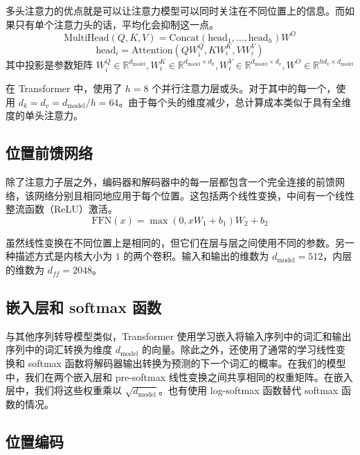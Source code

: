 多头注意力的优点就是可以让注意力模型可以同时关注在不同位置上的信息。而如果只有单个注意力头的话，平均化会抑制这一点。
\begin{equation}
\text{MultiHead}(Q, K, V) = \text{Concat}(\text{head}_1, ..., \text{head}_h)W^O
\label{eq3.2}
\end{equation}
\begin{equation}
\text{head}_i = \text{Attention}(QW_i^Q, KW_i^K, VW_i^V)
\label{eq3.3}
\end{equation}
其中投影是参数矩阵 $W_i^Q \in \mathbb{R}^{d_{\text{model}}}, W_i^K \in \mathbb{R}^{d_{\text{model}} \times d_k}, W_i^V \in \mathbb{R}^{d_{\text{model}} \times d_v}, W^O \in \mathbb{R}^{hd_v \times d_{\text{model}}}$

在 Transformer 中，使用了 $h = 8$ 个并行注意力层或头。对于其中的每一个，使用 $d_k = d_v = d_{\text{model}} / h = 64$。由于每个头的维度减少，总计算成本类似于具有全维度的单头注意力。

\subsection{位置前馈网络}
除了注意力子层之外，编码器和解码器中的每一层都包含一个完全连接的前馈网络，该网络分别且相同地应用于每个位置。这包括两个线性变换，中间有一个线性整流函数（ReLU）激活。
\begin{equation}
\text{FFN}(x) = \max(0, xW_1 + b_1)W_2 + b_2
\label{eq3.4}
\end{equation}

虽然线性变换在不同位置上是相同的，但它们在层与层之间使用不同的参数。另一种描述方式是内核大小为 $1$ 的两个卷积。输入和输出的维数为 $d_{\text{model}} = 512$，内层的维数为 $d_{ff} = 2048$。

\subsection{嵌入层和 softmax 函数}

与其他序列转导模型类似，Transformer 使用学习嵌入将输入序列中的词汇和输出序列中的词汇转换为维度 $d_{\text{model}}$ 的向量。除此之外，还使用了通常的学习线性变换和 softmax 函数将解码器输出转换为预测的下一个词汇的概率。在我们的模型中，我们在两个嵌入层和 pre-softmax 线性变换之间共享相同的权重矩阵。在嵌入层中，我们将这些权重乘以 $\sqrt{d_{\text{model}}}$。也有使用 log-softmax 函数替代 softmax 函数的情况。

\subsection{位置编码}

